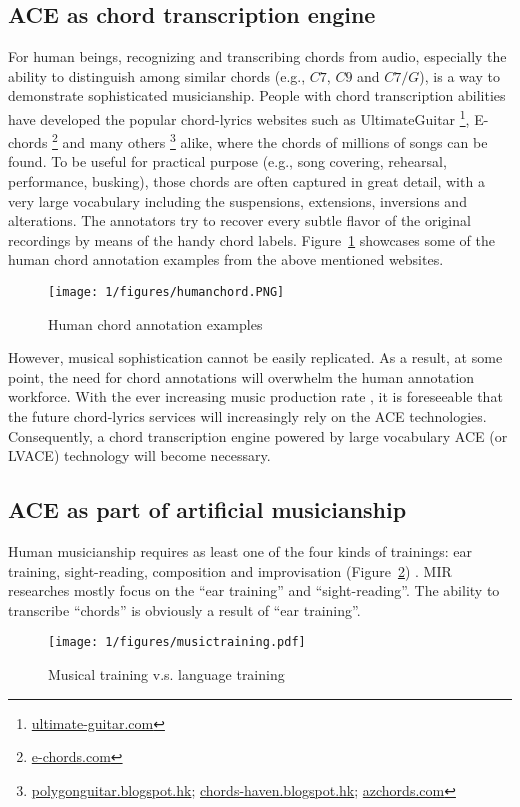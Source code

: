 \subsection{ACE as chord transcription engine}
For human beings, recognizing and transcribing chords from audio, especially the ability to distinguish among similar chords (e.g., $C7$, $C9$ and $C7/G$), is a way to demonstrate sophisticated musicianship. People with chord transcription abilities have developed the popular chord-lyrics websites such as UltimateGuitar \footnote{\url{ultimate-guitar.com}}, E-chords \footnote{\url{e-chords.com}} and many others \footnote{\url{polygonguitar.blogspot.hk}; \url{chords-haven.blogspot.hk}; \url{azchords.com}} alike, where the chords of millions of songs can be found. To be useful for practical purpose (e.g., song covering, rehearsal, performance, busking), those chords are often captured in great detail, with a very large vocabulary including the suspensions, extensions, inversions and alterations. The annotators try to recover every subtle flavor of the original recordings by means of the handy chord labels. Figure~\ref{fig:1-humanchord} showcases some of the human chord annotation examples from the above mentioned websites.
\begin{figure}[htb]
\centering
\texttt{[image: 1/figures/humanchord.PNG]}
\caption{Human chord annotation examples}
\label{fig:1-humanchord}
\end{figure}

However, musical sophistication cannot be easily replicated. As a result, at some point, the need for chord annotations will overwhelm the human annotation workforce. With the ever increasing music production rate \cite{globalmusicreport}, it is foreseeable that the future chord-lyrics services will increasingly rely on the ACE technologies. Consequently, a chord transcription engine powered by large vocabulary ACE (or LVACE) technology will become necessary.

\subsection{ACE as part of artificial musicianship}
Human musicianship requires as least one of the four kinds of trainings: ear training, sight-reading, composition and improvisation (Figure~\ref{fig:1-musictraining}) . MIR researches mostly focus on the ``ear training'' and ``sight-reading''. The ability to transcribe ``chords'' is obviously a result of ``ear training''.
\begin{figure}[htb]
\centering
\texttt{[image: 1/figures/musictraining.pdf]}
\caption{Musical training v.s. language training}
\label{fig:1-musictraining}
\end{figure}

